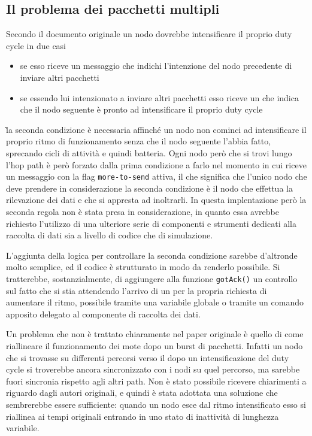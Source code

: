\documentclass[twoside,11pt,a4paper,italian,openany]{book}
\begin{document}
\subsection{Il problema dei pacchetti multipli}
Secondo il documento originale un nodo dovrebbe intensificare il proprio duty cycle in due casi
\begin{itemize}
\item{se esso riceve un messaggio che indichi l'intenzione del nodo precedente di inviare altri 
pacchetti}
\item{se essendo lui intenzionato a inviare altri pacchetti esso riceve un \ack che indica che il nodo seguente è pronto ad intensificare il proprio duty cycle}
\end{itemize}
\`la seconda condizione è necessaria affinché un nodo non cominci ad intensificare il proprio 
ritmo di funzionamento senza che il nodo seguente l'abbia fatto, sprecando cicli di attività e 
quindi batteria. Ogni nodo però che si trovi lungo l'hop path è però forzato dalla prima 
condizione a farlo nel momento in cui riceve un messaggio con la flag \texttt{more-to-send} 
attiva, il che significa che l'unico nodo che deve prendere in considerazione la seconda 
condizione è il nodo che effettua la rilevazione dei dati e che si appresta ad inoltrarli. 
In questa implentazione però la seconda regola non è stata presa in considerazione, in quanto 
essa avrebbe richiesto l'utilizzo di una ulteriore serie di componenti e strumenti dedicati alla 
raccolta di dati sia a livello di codice che di simulazione.

L'aggiunta della logica per controllare la seconda condizione sarebbe d'altronde molto 
semplice, ed il codice è strutturato in modo da renderlo possibile.
Si tratterebbe, sostanzialmente, di aggiungere alla funzione \texttt{gotAck()} un controllo sul 
fatto che si stia attendendo l'arrivo di un \ack per la propria richiesta di aumentare il ritmo,
possibile tramite una variabile globale o tramite un comando apposito delegato al componente di 
raccolta dei dati.  

Un problema che non è trattato chiaramente nel paper originale\cite{DMAC} è quello di come 
riallineare il funzionamento dei mote dopo un burst di pacchetti. 
Infatti un nodo che si trovasse su differenti percorsi verso il \sink dopo un intensificazione 
del duty cycle si troverebbe ancora sincronizzato con i nodi su quel percorso, ma sarebbe 
fuori sincronia rispetto agli altri path. 
Non è stato possibile ricevere chiarimenti a riguardo dagli autori originali, e quindi è stata 
adottata una soluzione che sembrerebbe essere sufficiente: quando un nodo esce dal ritmo 
intensificato esso si riallinea ai tempi originali entrando in uno stato di inattività di 
lunghezza variabile.
 
\end{document}
